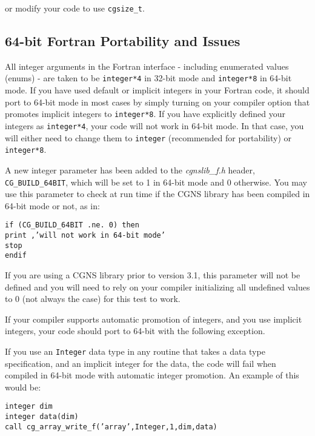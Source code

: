 \noindent or modify your code to use \texttt{cgsize\_t}.

\subsection{64-bit Fortran Portability and Issues}

All integer arguments in the Fortran interface - including
enumerated values (enums) - are taken to be
\texttt{integer*4} in 32-bit mode and \texttt{integer*8}
in 64-bit mode. If you have used default or implicit integers in
your Fortran code, it should port to 64-bit mode in most cases by
simply turning on your compiler option that promotes implicit
integers to \texttt{integer*8}. If you have explicitly defined your
integers as \texttt{integer*4}, your code will not work in 64-bit mode.
In that case, you will either need to change them to \texttt{integer}
(recommended for portability) or \texttt{integer*8}.

A new integer parameter has been added to the \textit{cgnslib\_f.h}
header, \texttt{CG\_BUILD\_64BIT}, which will be set
to 1 in 64-bit mode and 0 otherwise. You may use this parameter
to check at run time if the CGNS library has been compiled in 64-bit
mode or not, as in:

\noindent \texttt{if (CG\_BUILD\_64BIT .ne. 0) then} \\
\indent \texttt{print \*,'will not work in 64-bit mode'} \\
\indent \texttt{stop} \\
\noindent \texttt{endif}

If you are using a CGNS library prior to version 3.1, this parameter will
not be defined and you will need to rely on your compiler initializing all
undefined values to 0 (not always the case) for this test to work.

If your compiler supports automatic promotion of integers, and you use
implicit integers, your code should port to 64-bit with the following exception.

If you use an \texttt{Integer} data type in any routine that takes
a data type specification, and an implicit integer for the data, the code
will fail when compiled in 64-bit mode with automatic integer promotion.
An example of this would be:

\noindent \texttt{integer dim} \\
\noindent \texttt{integer data(dim)} \\
\noindent \texttt{call cg\_array\_write\_f('array',Integer,1,dim,data)} \\

